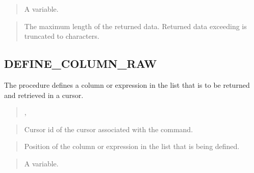\documentclass[letterpaper,10pt,english,openany,oneside]{sphinxmanual}
\begin{document}
\begin{quote}

A  variable.
\end{quote}

\begin{quote}

The maximum length of the returned data. Returned data exceeding
 is truncated to  characters.
\end{quote}

\newpage


\subsection{DEFINE\_COLUMN\_RAW}
\label{\detokenize{define_column_raw::doc}}\label{\detokenize{define_column_raw:define-column-raw}}
The  procedure defines a  column or expression in
the  list that is to be returned and retrieved in a cursor.
\begin{quote}

,

\end{quote}


\begin{quote}

Cursor id of the cursor associated with the  command.
\end{quote}

\begin{quote}

Position of the column or expression in the  list that is being
defined.
\end{quote}

\begin{quote}

A  variable.
\end{quote}
\end{document}
